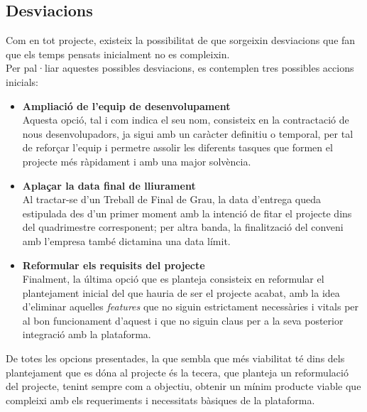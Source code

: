 \subsection{Desviacions}
Com en tot projecte, existeix la possibilitat de que sorgeixin desviacions que fan que els temps pensats inicialment no es compleixin.\\
Per pal·liar aquestes possibles desviacions, es contemplen tres possibles accions inicials:
\begin{itemize}
	\item \textbf{Ampliació de l'equip de desenvolupament}\\
Aquesta opció, tal i com indica el seu nom, consisteix en la contractació de nous desenvolupadors, ja sigui amb un caràcter definitiu o temporal, per tal de reforçar l'equip i permetre assolir les diferents tasques que formen el projecte més ràpidament i amb una major solvència.\\
	\item \textbf{Aplaçar la data final de lliurament}\\
Al tractar-se d'un Treball de Final de Grau, la data d'entrega queda estipulada des d'un primer moment amb la intenció de fitar el projecte dins del quadrimestre corresponent; per altra banda, la finalització del conveni amb l'empresa també dictamina una data límit.\\
	\item \textbf{Reformular els requisits del projecte}\\
Finalment, la última opció que es planteja consisteix en reformular el plantejament inicial del que hauria de ser el projecte acabat, amb la idea d'eliminar aquelles \textit{features} que no siguin estrictament necessàries i vitals per al bon funcionament d'aquest i que no siguin claus per a la seva posterior integració amb la plataforma.\\
\end{itemize}
De totes les opcions presentades, la que sembla que més viabilitat té dins dels plantejament que es dóna al projecte és la tecera, que planteja un reformulació del projecte, tenint sempre com a objectiu, obtenir un mínim producte viable que compleixi amb els requeriments i necessitats bàsiques de la plataforma.

